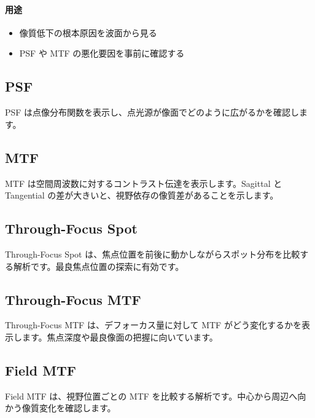 \documentclass[11pt]{article}
\begin{document}
\paragraph{用途}
\begin{itemize}
  \item 像質低下の根本原因を波面から見る
  \item PSF や MTF の悪化要因を事前に確認する
\end{itemize}

\subsection{PSF}
PSF は点像分布関数を表示し、点光源が像面でどのように広がるかを確認します。

\subsection{MTF}
MTF は空間周波数に対するコントラスト伝達を表示します。Sagittal と Tangential の差が大きいと、視野依存の像質差があることを示します。

\subsection{Through-Focus Spot}
Through-Focus Spot は、焦点位置を前後に動かしながらスポット分布を比較する解析です。最良焦点位置の探索に有効です。

\subsection{Through-Focus MTF}
Through-Focus MTF は、デフォーカス量に対して MTF がどう変化するかを表示します。焦点深度や最良像面の把握に向いています。

\subsection{Field MTF}
Field MTF は、視野位置ごとの MTF を比較する解析です。中心から周辺へ向かう像質変化を確認します。
\end{document}

